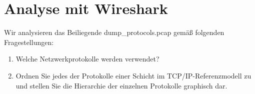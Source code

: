 \documentclass[11pt]{article}
\begin{document}
    \section{Analyse mit Wireshark}
    Wir analysieren das Beiliegende dump_protocols.pcap gemäß folgenden Fragestellungen:
    \begin{enumerate}{\thesection .1}
        \item Welche Netzwerkprotokolle werden verwendet?

        \item Ordnen Sie jedes der Protokolle einer Schicht im TCP/IP-Referenzmodell zu und
        stellen Sie die Hierarchie der einzelnen Protokolle graphisch dar.
    \end{enumerate}
\end{document}
